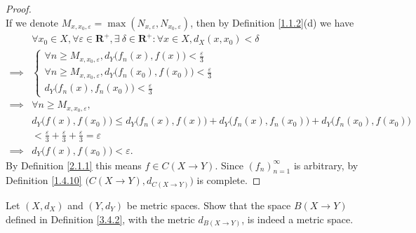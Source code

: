 \begin{proof}
\[    \]
    If we denote \(M_{x, x_0, \varepsilon} = \max(N_{x, \varepsilon}, N_{x_0, \varepsilon})\), then by Definition \ref{1.1.2}(d) we have
    \begin{align*}
                 & \forall x_0 \in X, \forall \varepsilon \in \mathbf{R}^+, \exists\ \delta \in \mathbf{R}^+ : \forall x \in X, d_X(x, x_0) < \delta \\
        \implies & \begin{cases}
                       \forall n \geq M_{x, x_0, \varepsilon}, d_Y\big(f_n(x), f(x)\big) < \frac{\varepsilon}{3}     \\
                       \forall n \geq M_{x, x_0, \varepsilon}, d_Y\big(f_n(x_0), f(x_0)\big) < \frac{\varepsilon}{3} \\
                       d_Y\big(f_n(x), f_n(x_0)\big) < \frac{\varepsilon}{3}
                   \end{cases}                                     \\
        \implies & \forall n \geq M_{x, x_0, \varepsilon},                                                                                           \\
                 & d_Y\big(f(x), f(x_0)\big) \leq d_Y\big(f_n(x), f(x)\big) + d_Y\big(f_n(x), f_n(x_0)\big) + d_Y\big(f_n(x_0), f(x_0)\big)          \\
                 & < \frac{\varepsilon}{3} + \frac{\varepsilon}{3} + \frac{\varepsilon}{3} = \varepsilon                                             \\
        \implies & d_Y\big(f(x), f(x_0)\big) < \varepsilon.
    \end{align*}
    By Definition \ref{2.1.1} this means \(f \in C(X \to Y)\).
    Since \((f_n)_{n = 1}^\infty\) is arbitrary, by Definition \ref{1.4.10} \(\big(C(X \to Y), d_{C(X \to Y)}\big)\) is complete.
\end{proof}

\exercisesection

\begin{exercise}\label{ex 3.4.1}
    Let \((X, d_X)\) and \((Y, d_Y)\) be metric spaces.
    Show that the space \(B(X \to Y)\) defined in Definition \ref{3.4.2}, with the metric \(d_{B(X \to Y)}\), is indeed a metric space.
\end{exercise}

